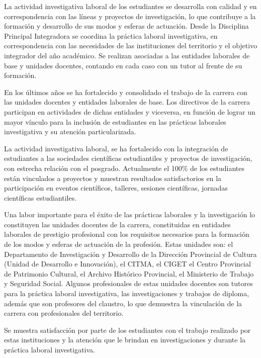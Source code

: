 La actividad investigativa laboral de los estudiantes se desarrolla con calidad y en correspondencia con las líneas y proyectos de investigación, lo que contribuye a la formación y desarrollo de sus modos y esferas de actuación. Desde la Disciplina Principal Integradora se coordina la práctica laboral investigativa, en correspondencia con las necesidades de las instituciones del territorio y el objetivo integrador del año académico. Se realizan asociadas a las entidades laborales de base y unidades docentes, contando en cada caso con un tutor al frente de su formación.

En los últimos años se ha fortalecido y consolidado el trabajo de la carrera con las unidades docentes y entidades laborales de base. Los directivos de la carrera participan en actividades de dichas entidades y viceversa, en función de lograr un mayor vínculo para la inclusión de estudiantes en las prácticas laborales investigativa y su atención particularizada.

La actividad investigativa laboral, se ha fortalecido con la integración de estudiantes a las sociedades científicas estudiantiles y proyectos de investigación, con estrecha relación con el posgrado. Actualmente el 100\% de los estudiantes están vinculados a proyectos y muestran resultados satisfactorios en la participación en eventos científicos, talleres, sesiones científicas, jornadas científicas estudiantiles.

Una labor importante para el éxito de las prácticas laborales y la investigación lo constituyen las unidades docentes de la carrera, constituidas en entidades laborales de prestigio profesional con los requisitos necesarios para la formación de los modos y esferas de actuación de la profesión. Estas unidades son: el Departamento de Investigación y Desarrollo de la Dirección Provincial de Cultura (Unidad de Desarrollo e Innovación), el CITMA, el CIGET el Centro Provincial de Patrimonio Cultural, el Archivo Histórico Provincial, el Ministerio de Trabajo y Seguridad Social. Algunos profesionales de estas unidades docentes son tutores para la práctica laboral investigativa, las investigaciones y trabajos de diploma, además que son profesores del claustro, lo que demuestra la vinculación de la carrera con profesionales del territorio.

Se muestra satisfacción por parte de los estudiantes con el trabajo realizado por estas instituciones y la atención que le brindan en investigaciones y durante la práctica laboral investigativa.